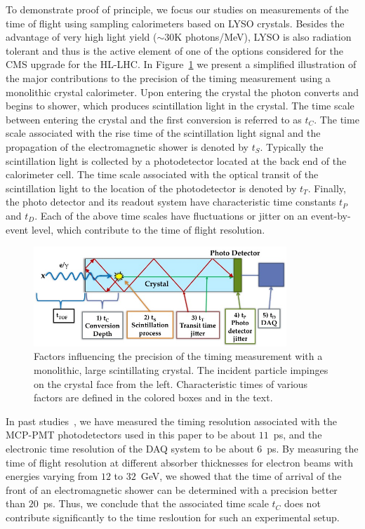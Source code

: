 \documentclass[12pt]{article}
\begin{document}
To demonstrate proof of principle, we focus our studies on
measurements of the time of flight using sampling calorimeters
based on LYSO crystals. Besides the advantage of very high light
yield ($\sim 30$K photons/MeV), LYSO is also radiation tolerant and
thus is the active element of one of the options considered 
for the CMS upgrade for the HL-LHC. In Figure~\ref{fig:ScintillatorTiming} 
we present a simplified illustration of the major contributions to the 
precision of the timing measurement using a monolithic crystal calorimeter.
Upon entering the crystal the photon converts and begins to shower,
which produces scintillation light in the crystal. The time scale
between entering the crystal and the first conversion is referred to
as $t_C$. The time scale associated with the rise time of the scintillation 
light signal and the propagation of the electromagnetic shower is denoted
by $t_S$. Typically the scintillation light is collected by a photodetector
located at the back end of the calorimeter cell. The time scale associated
with the optical transit of the scintillation light to the location of the
photodetector is denoted by $t_T$. Finally, the photo detector and
its readout system have characteristic time constants $t_P$ and $t_D$.
Each of the above time scales have fluctuations or jitter on an event-by-event
level, which contribute to the time of flight resolution.

\begin{figure}[h] \centering
\includegraphics[width=0.85\textwidth]{figs/ScintillatorTiming} \caption{Factors
influencing the precision of the timing measurement with a monolithic, large
scintillating crystal. The incident particle impinges on the crystal face from
the left. Characteristic times of various factors are defined in the colored
boxes and in the text.}
\label{fig:ScintillatorTiming}
\end{figure}

In past studies~\cite{MCPFastCaloNIMA}, we have measured the timing resolution
associated with the MCP-PMT photodetectors used in this paper to be
about $11$~ps, and the electronic time resolution
of the DAQ system to be about $6$~ps. By measuring the time of flight
resolution at different absorber thicknesses for electron beams with
energies varying from $12$ to $32$~GeV, we showed that the 
time of arrival of the front of an electromagnetic shower
can be determined with a precision better than $20$~ps.
Thus, we conclude that the associated time scale
$t_{C}$ does not contribute significantly to the time
resloution for such an experimental setup. 
\end{document}
